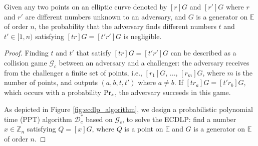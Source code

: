   \begin{lemma}\label{lemma-rp}
    Given any two points on an elliptic curve denoted by $[r]G$ and $[r']G$ 
    where $r$ and $r'$ are different numbers unknown to an adversary, 
    and $G$ is a generator on $\mathbb{E}$ of order $n$, 
    the probability that the adversary finds different numbers $t$ and $t' \in [1,n)$ 
    satisfying $[tr]G = [t'r']G$ is negligible.
  \end{lemma}
  \begin{proof}
    Finding $t$ and $t'$ that satisfy $[tr]G = [t'r']G$ can be described as 
    a collision game $\mathcal{G}_c$ between an adversary and a challenger: 
    the adversary receives from the challenger a finite set of points, 
    i.e., $[r_1]G$, ..., $[r_m]G$, where $m$ is the number of points, 
    and outputs $(a, b, t, t')$ where $a \neq b$. If $[tr_a]G=[t'r_b]G$, 
    which occurs with a probability ${\rm Pr}_s$, the adversary succeeds in this game.
    
    As depicted in Figure \ref{fig:ecdlp_algorithm}, 
    we design a probabilistic polynomial time (PPT) algorithm $\mathcal{D}^*_c$ based on $\mathcal{G}_c$, 
    to solve the ECDLP: find a number $x \in \mathbb{Z}_n$ satisfying $Q = [x]G$, 
    where $Q$ is a point on $\mathbb{E}$ and $G$ is a generator on $\mathbb{E}$ of order $n$.
  

\end{proof}
